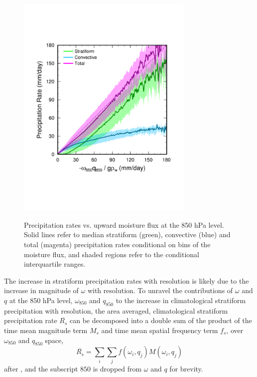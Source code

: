 \documentclass[times]{qjrms4}
\begin{document}
\begin{figure}
\begin{center}
\noindent\includegraphics[width=20pc,angle=0]{figs/temp_mflux.pdf}\\
\end{center}
\caption{Precipitation rates vs. upward moisture flux at the 850 hPa level. Solid lines refer to median stratiform (green), convective (blue) and total (magenta) precipitation rates conditional on bins of the moisture flux, and shaded regions refer to the conditional interquartile ranges.}
\label{fig:mflux}
\end{figure}

The increase in stratiform precipitation rates with resolution is likely due to the increase in magnitude of $\omega$ with resolution. To unravel the contributions of $\omega$ and $q$ at the 850 hPa level, $\omega_{850}$ and $q_{850}$ to the increase in climatological stratiform precipitation with resolution, the area averaged, climatological stratiform precipitation rate $\overline{R_{s}}$ can be decomposed into a double sum of the product of the time mean magnitude term $M_s$ and time mean spatial frequency term $f_s$, over $\omega_{850}$ and $q_{850}$ space,
\begin{equation}
\overline{R_{s}} = \sum_i \sum_j f \left( \omega_i , q_j \right) M \left( \omega_i , q_j \right) \label{eq:pdecomp}
\end{equation}
after \cite{TETAL2018CD}, and the subscript $850$ is dropped from $\omega$ and $q$ for brevity. 
\end{document}
